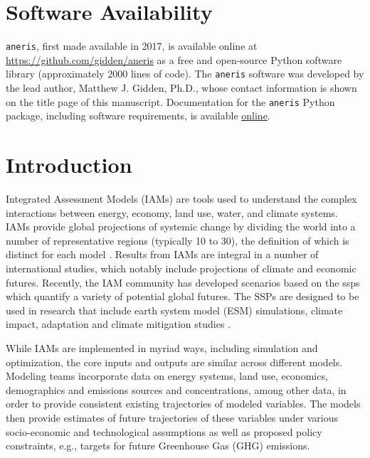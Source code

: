\documentclass[review]{elsarticle}
\begin{document}
\linenumbers

\newpage
\section*{Software Availability}

\texttt{aneris}, first made available in 2017, is available online at
\url{https://github.com/gidden/aneris} as a free and open-source Python software
library (approximately 2000 lines of code). The \texttt{aneris} software was
developed by the lead author, Matthew J. Gidden, Ph.D., whose contact
information is shown on the title page of this manuscript. Documentation for the
\texttt{aneris} Python package, including software requirements, is available
\href{http://mattgidden.com/aneris/}{online}.

\newpage

\section{Introduction}

Integrated Assessment Models (IAMs) are tools used to understand the complex
interactions between energy, economy, land use, water, and climate systems. IAMs
provide global projections of systemic change by dividing the world into a
number of representative regions (typically 10 to 30), the definition of which
is distinct for each model \cite{krey_global_2014}. Results from IAMs are
integral in a number of international studies, which notably include projections
of climate and economic futures. Recently, the IAM community has developed
scenarios based on the \gls{ssps}
\cite{van_vuuren_energy_2017, fricko_marker_2017, fujimori_ssp3:_2017,
  calvin_ssp4:_2017, kriegler_fossil-fueled_2017} which quantify a variety of
potential global futures. The SSPs are designed to be used in research that
include earth system model (ESM) simulations, climate impact, adaptation and
climate mitigation studies \cite{vuuren_new_2013}.

While IAMs are implemented in myriad ways, including simulation and
optimization, the core inputs and outputs are similar across different
models. Modeling teams incorporate data on energy systems, land use, economics,
demographics and emissions sources and concentrations, among other data, in
order to provide consistent existing trajectories of modeled variables. The
models then provide estimates of future trajectories of these variables under
various socio-economic and technological assumptions as well as proposed policy
constraints, e.g., targets for future Greenhouse Gas (GHG) emissions.
\end{document}
